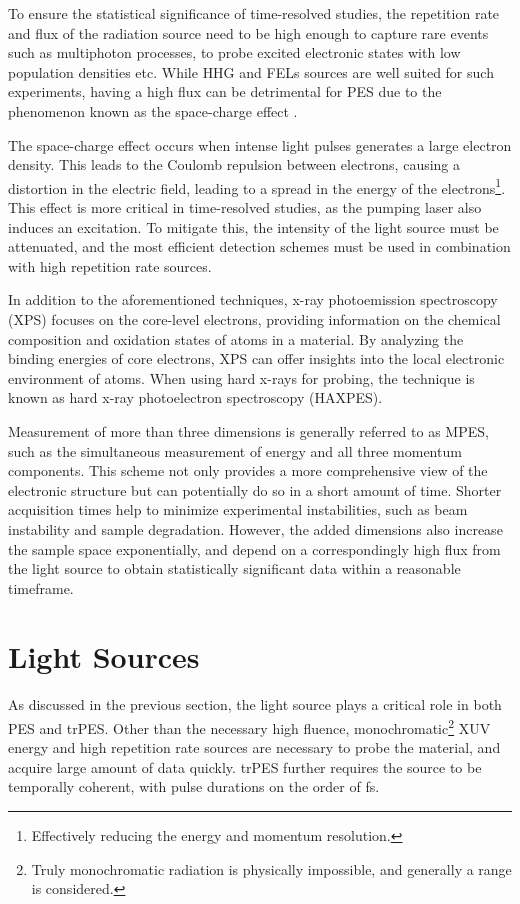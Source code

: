 To ensure the statistical significance of time-resolved studies, the repetition rate and flux of the radiation source need to be high enough to capture rare events such as multiphoton processes, to probe excited electronic states with low population densities etc. While \gls{HHG} and \glspl{FEL} sources are well suited for such experiments, having a high flux can be detrimental for \gls{PES} due to the phenomenon known as the space-charge effect \cite{schonhenseMultidimensionalPhotoemissionSpectroscopy2018}.

The space-charge effect occurs when intense light pulses generates a large electron density. This leads to the Coulomb repulsion between electrons, causing a distortion in the electric field, leading to a spread in the energy of the electrons\footnote{Effectively reducing the energy and momentum resolution.}. This effect is more critical in time-resolved studies, as the pumping laser also induces an excitation. To mitigate this, the intensity of the light source must be attenuated, and the most efficient detection schemes must be used in combination with high repetition rate sources.

In addition to the aforementioned techniques, x-ray photoemission spectroscopy (XPS) focuses on the core-level electrons, providing information on the chemical composition and oxidation states of atoms in a material. By analyzing the binding energies of core electrons, XPS can offer insights into the local electronic environment of atoms. When using hard x-rays for probing, the technique is known as hard x-ray photoelectron spectroscopy (HAXPES).

Measurement of more than three dimensions is generally referred to as \gls{MPES}, such as the simultaneous measurement of energy and all three momentum components. This scheme not only provides a more comprehensive view of the electronic structure but can potentially do so in a short amount of time. Shorter acquisition times help to minimize experimental instabilities, such as beam instability and sample degradation. However, the added dimensions also increase the sample space exponentially, and depend on a correspondingly high flux from the light source to obtain statistically significant data within a reasonable timeframe.

\section{Light Sources}\label{section:light-sources}
As discussed in the previous section, the light source plays a critical role in both \gls{PES} and \gls{trPES}. Other than the necessary high fluence, monochromatic\footnote{Truly monochromatic radiation is physically impossible, and generally a range is considered.} \gls{XUV} energy and high repetition rate sources are necessary to probe the material, and acquire large amount of data quickly. \Gls{trPES} further requires the source to be temporally coherent, with pulse durations on the order of \unit{fs}.

